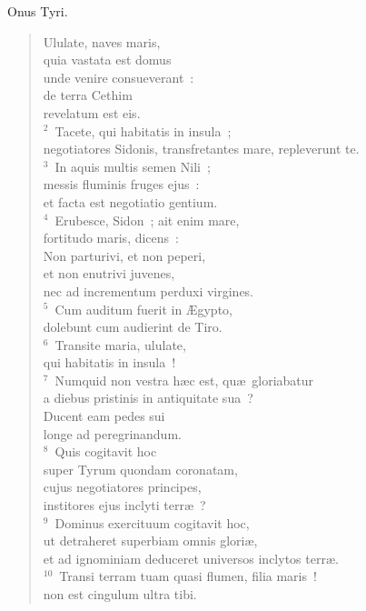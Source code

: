 \lettrine[lines=3,image=true,loversize=0.05,lraise=-0.03]{O}{}nus Tyri. \begin{flushleft}\begin{verse}\vspace{6pt}Ululate, naves maris,\\ quia vastata est domus\\ unde venire consueverant~:\\ de terra Cethim\\ revelatum est eis.\\
${}^{2}$~Tacete, qui habitatis in insula~;\\ negotiatores Sidonis, transfretantes mare, repleverunt te.\\
${}^{3}$~In aquis multis semen Nili~;\\ messis fluminis fruges ejus~:\\ et facta est negotiatio gentium.\\
${}^{4}$~Erubesce, Sidon~; ait enim mare,\\ fortitudo maris, dicens~:\\ Non parturivi, et non peperi,\\ et non enutrivi juvenes,\\ nec ad incrementum perduxi virgines.\\
${}^{5}$~Cum auditum fuerit in \AE gypto,\\ dolebunt cum audierint de Tiro.\\
${}^{6}$~Transite maria, ululate,\\ qui habitatis in insula~!\\
${}^{7}$~Numquid non vestra h\ae c est, qu\ae\ gloriabatur\\ a diebus pristinis in antiquitate sua~?\\ Ducent eam pedes sui\\ longe ad peregrinandum.\\
${}^{8}$~Quis cogitavit hoc\\ super Tyrum quondam coronatam,\\ cujus negotiatores principes,\\ institores ejus inclyti terr\ae~?\\
${}^{9}$~Dominus exercituum cogitavit hoc,\\ ut detraheret superbiam omnis glori\ae ,\\ et ad ignominiam deduceret universos inclytos terr\ae .\\
${}^{10}$~Transi terram tuam quasi flumen, filia maris~!\\ non est cingulum ultra tibi.\\

\end{verse}
\end{flushleft}
